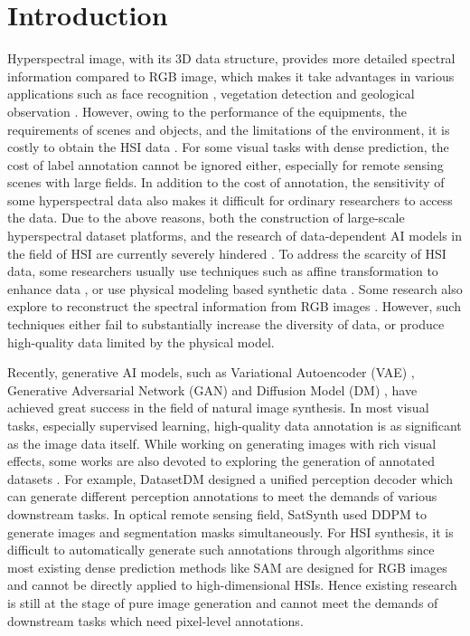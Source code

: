 \section{Introduction}
\label{sec:intro}
Hyperspectral image, with its 3D data structure, provides more detailed spectral information compared to RGB image, which makes it take advantages in various applications such as face recognition \cite{face1, face2, face3}, vegetation detection \cite{vegetation1, vegetation2, vegetation3} and geological observation \cite{earth1, earth2, earth3}. However, owing to the performance of the equipments, the requirements of scenes and objects, and the limitations of the environment, it is costly to obtain the HSI data \cite{scarse1, scarse2}. For some visual tasks with dense prediction, the cost of label annotation cannot be ignored either, especially for remote sensing scenes with large fields. In addition to the cost of annotation, the sensitivity of some hyperspectral data also makes it difficult for ordinary researchers to access the data. Due to the above reasons, both the construction of large-scale hyperspectral dataset platforms, and the research of data-dependent AI models in the field of HSI are currently severely hindered \cite{challenge1, challenge2}.
To address the scarcity of HSI data, some researchers usually use techniques such as affine transformation to enhance data \cite{affine}, or use physical modeling based synthetic data \cite{physics}. Some research also explore to reconstruct the spectral information from RGB images \cite{he2023spectral}. However, such techniques either fail to substantially increase the diversity of data, or produce high-quality data limited by the physical model.

Recently, generative AI models, such as Variational Autoencoder (VAE) \cite{vae1, vae2}, Generative Adversarial Network (GAN) \cite{gan1, gan2} and Diffusion Model (DM) \cite{dm1, dm2, ldm}, have achieved great success in the field of natural image synthesis. In most visual tasks, especially supervised learning, high-quality data annotation is as significant as the image data itself. While working on generating images with rich visual effects, some works are also devoted to exploring the generation of annotated datasets \cite{datasetgan, bigdatasetgan, diffumask, datasetdm}. For example, DatasetDM \cite{datasetdm} designed a unified perception decoder which can generate different perception annotations to meet the demands of various downstream tasks. In optical remote sensing field, SatSynth \cite{satsynth} used DDPM \cite{dm2} to generate images and segmentation masks simultaneously. For HSI synthesis, it is difficult to automatically generate such annotations through algorithms since most existing dense prediction methods like SAM \cite{sam} are designed for RGB images and cannot be directly applied to high-dimensional HSIs. Hence existing research is still at the stage of pure image generation \cite{yu2024unmixing, yu2024unmixdiff, hsigene} and cannot meet the demands of downstream tasks which need pixel-level annotations.

